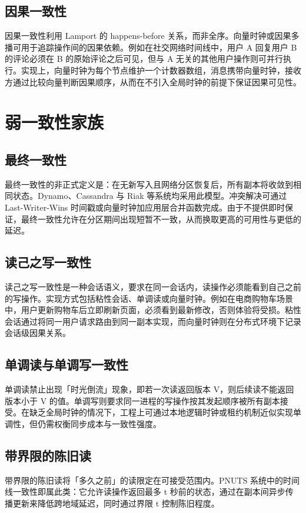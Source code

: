 \section{因果一致性}
因果一致性利用 Lamport 的 happens-before 关系，而非全序。向量时钟或因果多播可用于追踪操作间的因果依赖。例如在社交网络时间线中，用户 A 回复用户 B 的评论必须在 B 的原始评论之后可见，但与 A 无关的其他用户操作则可并行执行。实现上，向量时钟为每个节点维护一个计数器数组，消息携带向量时钟，接收方通过比较向量判断因果顺序，从而在不引入全局时钟的前提下保证因果可见性。\par
\chapter{弱一致性家族}
\section{最终一致性}
最终一致性的非正式定义是：在无新写入且网络分区恢复后，所有副本将收敛到相同状态。Dynamo、Cassandra 与 Riak 等系统均采用此模型。冲突解决可通过 Last-Writer-Wins 时间戳或向量时钟加应用层合并函数完成。由于不提供即时保证，最终一致性允许在分区期间出现短暂不一致，从而换取更高的可用性与更低的延迟。\par
\section{读己之写一致性}
读己之写一致性是一种会话语义，要求在同一会话内，读操作必须能看到自己之前的写操作。实现方式包括粘性会话、单调读或向量时钟。例如在电商购物车场景中，用户更新购物车后立即刷新页面，必须看到最新修改，否则体验将受损。粘性会话通过将同一用户请求路由到同一副本实现，而向量时钟则在分布式环境下记录会话级因果关系。\par
\section{单调读与单调写一致性}
单调读禁止出现「时光倒流」现象，即若一次读返回版本 V，则后续读不能返回版本小于 V 的值。单调写则要求同一进程的写操作按其发起顺序被所有副本接受。在缺乏全局时钟的情况下，工程上可通过本地逻辑时钟或租约机制近似实现单调性，但仍需权衡同步成本与一致性强度。\par
\section{带界限的陈旧读}
带界限的陈旧读将「多久之前」的读限定在可接受范围内。PNUTS 系统中的时间线一致性即属此类：它允许读操作返回最多 t 秒前的状态，通过在副本间异步传播更新来降低跨地域延迟，同时通过界限 t 控制陈旧程度。\par
